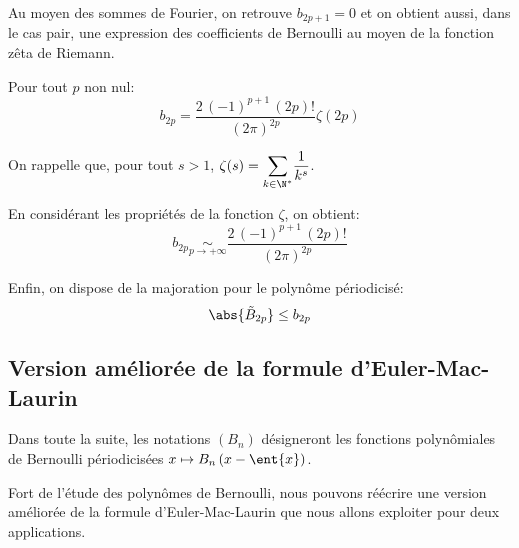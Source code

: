 \begin{listremarques}
\item
Au moyen des sommes de Fourier, on retrouve $b_{2p+1} = 0$ et on obtient aussi, dans le cas pair, une expression des coefficients de Bernoulli au moyen de la fonction zêta de Riemann.
\end{listremarques}

\begin{cor}
Pour tout $p$ non nul:
\begin{equation}
\label{bernoulli_zeta}
b_{2p} = \frac{2 \, (-1)^{p+1} \, (2p)!}{(2\pi)^{2p}} \zeta(2p)
\end{equation}



On rappelle que, pour tout $s>1$, $\zeta(s) = \displaystyle{\sum \limits_{k \in \N^*}} \frac{1}{k^s}$.

\medskip
En considérant les propriétés de la fonction $\zeta$, on obtient:
\begin{equation}
\label{equivalent_bernoulli}
b_{2p} \underset{p \to +\infty}{\sim} \frac{2 \, (-1)^{p+1} \, (2p)!}{(2\pi)^{2p}}
\end{equation}

Enfin, on dispose de la majoration pour le polynôme périodicisé:
\begin{equation}
\label{majoration_bernoulli}
\abs{\tilde{B}_{2p}} \leq b_{2p}
\end{equation}
\end{cor}

\subsection{Version améliorée de la formule d'Euler-Mac-Laurin}

\begin{nota}
Dans toute la suite, les notations $(B_n)$ désigneront les fonctions polynômiales de Bernoulli périodicisées
$
x \mapsto B_n \left ( x - \ent{x}\right )
$.
\end{nota}


Fort de l'étude des polynômes de Bernoulli, nous pouvons réécrire une version améliorée de la formule d'Euler-Mac-Laurin que nous allons exploiter pour deux applications.

